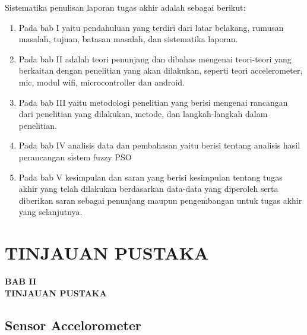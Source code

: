 \documentclass[11pt]{article}
\numberwithin{equation}{subsection}
\begin{document}
Sistematika penulisan laporan tugas akhir adalah sebagai berikut:

\begin{enumerate}[label=\alph*.]
	
		
	\item Pada bab I yaitu pendahuluan yang terdiri dari latar belakang, rumusan masalah, tujuan, batasan masalah, dan sistematika laporan. 
	\item Pada bab II adalah teori penunjang dan dibahas mengenai teori-teori yang berkaitan dengan penelitian yang akan dilakukan, seperti teori accelerometer, mic, modul wifi, microcontroller dan android.
	\item Pada bab III yaitu metodologi penelitian yang berisi mengenai rancangan dari penelitian yang dilakukan, metode, dan langkah-langkah dalam penelitian. 
	\item Pada bab IV analisis data dan pembahasan yaitu berisi tentang analisis hasil perancangan sistem fuzzy PSO
	\item Pada bab V kesimpulan dan saran yang berisi kesimpulan tentang tugas akhir yang telah dilakukan berdasarkan data-data yang diperoleh serta diberikan saran sebagai penunjang maupun pengembangan untuk tugas akhir yang selanjutnya. 
	
	
\end{enumerate}



\newpage

\setcounter{figure}{0}

\section{TINJAUAN PUSTAKA}

\begin{center}
	{\large \textbf{BAB II}} \\
	{\large \textbf{TINJAUAN PUSTAKA}}
\end{center}

\subsection{Sensor Accelorometer}
\end{document}
